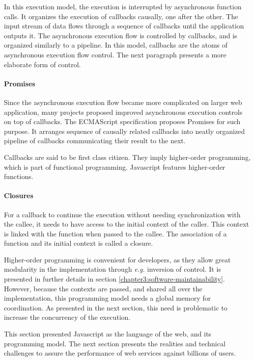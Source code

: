 In this execution model, the execution is interrupted by asynchronous function calls.
It organizes the execution of callbacks causally, one after the other.
The input stream of data flows through a sequence of callbacks until the application outputs it.
The asynchronous execution flow is controlled by callbacks, and is organized similarly to a pipeline.
In this model, callbacks are the atoms of asynchronous execution flow control.
The next paragraph presents a more elaborate form of control.

\paragraph{Promises}

Since the asynchronous execution flow became more complicated on larger web application, many projects proposed improved asynchronous execution controls on top of callbacks.
The ECMAScript specification proposes Promises for such purpose.
It arranges sequence of causally related callbacks into neatly organized pipeline of callbacks communicating their result to the next.

Callbacks are said to be first class citizen.
They imply higher-order programming, which is part of functional programming.
Javascript features higher-order functions.

\paragraph{Closures}

For a callback to continue the execution without needing synchronization with the callee, it needs to have access to the initial context of the caller.
This context is linked with the function when passed to the callee.
The association of a function and its initial context is called a closure.

Higher-order programming is convenient for developers, as they allow great modularity in the implementation through \textit{e.g.} inversion of control.
It is presented in further details in section \ref{chapter3:software-maintainability}.
However, because the contexts are passed, and shared all over the implementation, this programming model needs a global memory for coordination.
As presented in the next section, this need is problematic to increase the concurrency of the execution.

This section presented Javascript as the language of the web, and its programming model.
The next section presents the realities and technical challenges to assure the performance of web services against billions of users.

